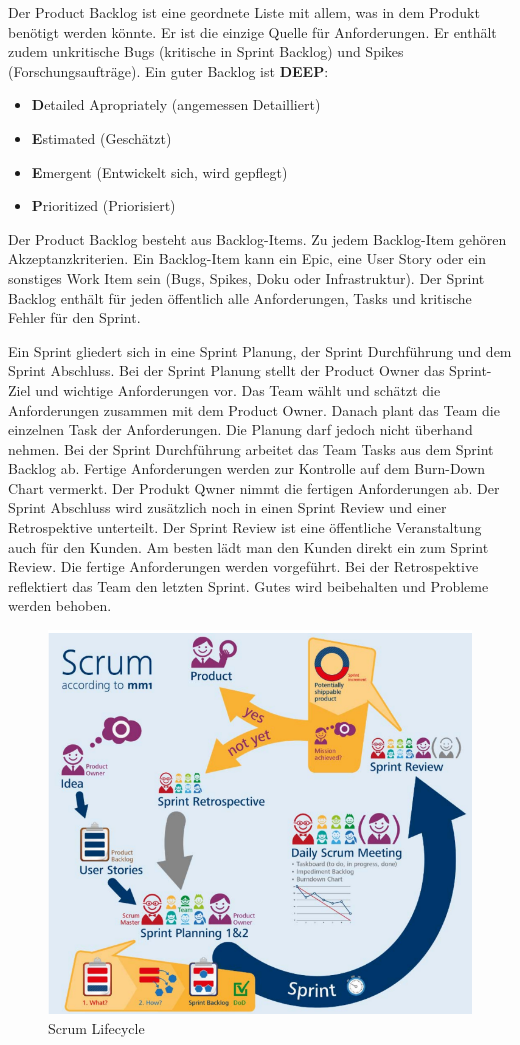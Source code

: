 Der Product Backlog ist eine geordnete Liste mit allem, was in dem Produkt benötigt werden könnte. Er ist die einzige Quelle für Anforderungen. Er enthält zudem unkritische Bugs (kritische in Sprint Backlog) und Spikes (Forschungsaufträge). Ein guter Backlog ist \textbf{DEEP}:
\begin{itemize}
	\item \textbf{D}etailed Apropriately (angemessen Detailliert)
	\item \textbf{E}stimated (Geschätzt)
	\item \textbf{E}mergent (Entwickelt sich, wird gepflegt)
	\item \textbf{P}rioritized (Priorisiert)
\end{itemize}
Der Product Backlog besteht aus Backlog-Items. Zu jedem Backlog-Item gehören Akzeptanzkriterien. Ein Backlog-Item kann ein Epic, eine User Story oder ein sonstiges Work Item sein (Bugs, Spikes, Doku oder Infrastruktur). Der Sprint Backlog enthält für jeden öffentlich alle Anforderungen, Tasks und kritische Fehler für den Sprint.

Ein Sprint gliedert sich in eine Sprint Planung, der Sprint Durchführung und dem Sprint Abschluss. 
Bei der Sprint Planung stellt der Product Owner das Sprint-Ziel und wichtige Anforderungen vor. Das Team wählt und schätzt die Anforderungen zusammen mit dem Product Owner. Danach plant das Team die einzelnen Task der Anforderungen. Die Planung darf jedoch nicht überhand nehmen.
Bei der Sprint Durchführung arbeitet das Team Tasks aus dem Sprint Backlog ab. Fertige Anforderungen werden zur Kontrolle auf dem Burn-Down Chart vermerkt. Der Produkt Qwner nimmt die fertigen Anforderungen ab. 
Der Sprint Abschluss wird zusätzlich noch in einen Sprint Review und einer Retrospektive unterteilt. Der Sprint Review ist eine öffentliche Veranstaltung auch für den Kunden. Am besten lädt man den Kunden direkt ein zum Sprint Review. Die fertige Anforderungen werden vorgeführt. Bei der Retrospektive reflektiert das Team den letzten Sprint. Gutes wird beibehalten und Probleme werden behoben.

\begin{figure}
\centering
\includegraphics[width=0.7\linewidth]{fig/scrum-lifecycle}
\caption{Scrum Lifecycle}
\label{fig:scrum-lifecycle}
\end{figure}

